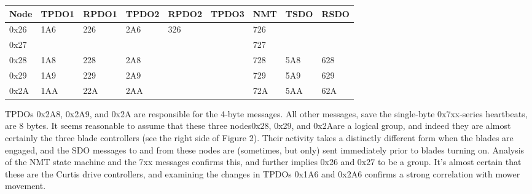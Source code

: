 \documentclass[letterpaper,10pt]{article}
\begin{document}
\begin{center}
\begin{tabular}[pos]{ | l | l | l | l | l | l | l | l | l | }
  \hline
Node & TPDO1 & RPDO1 & TPDO2 & RPDO2 & TPDO3 & NMT & TSDO & RSDO \\
  \hline
0x26 & 1A6 & 226 & 2A6 & 326 & & 726 & & \\
0x27 & & & & & & 727 & & \\
0x28 & 1A8 & 228 & 2A8 & & & 728 & 5A8 & 628 \\
0x29 & 1A9 & 229 & 2A9 & & & 729 & 5A9 & 629 \\
0x2A & 1AA & 22A & 2AA & & & 72A & 5AA & 62A \\
  \hline
\end{tabular}
\end{center}
TPDOs 0x2A8, 0x2A9, and 0x2A are responsible for the 4-byte messages. All other
messages, save the single-byte 0x7xx-series heartbeats, are 8 bytes. It seems
reasonable to assume that these three nodes{\textemdash}0x28, 0x29, and
0x2A{\textemdash}are a logical group, and indeed they are almost certainly the
three blade controllers (see the right side of Figure 2). Their activity takes
a distinctly different form when the blades are engaged, and the SDO messages
to and from these nodes are (sometimes, but only) sent immediately prior to
blades turning on. Analysis of the NMT state machine and the 7xx messages
confirms this, and further implies 0x26 and 0x27 to be a group. It's almost
certain that these are the Curtis drive controllers, and examining the changes
in TPDOs 0x1A6 and 0x2A6 confirms a strong correlation with mower movement.
\end{document}

